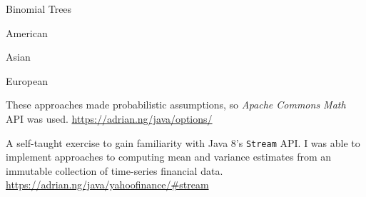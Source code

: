 \documentclass[letterpaper,11pt]{article}
\newcommand{\resumeItem}[3]{
	\item\small{
		\textbf{#1}\hfill\tiny{#2\\}\small{ #3 \vspace{-2pt}}
	}
}
\newcommand{\resumeSubItem}[3]{\resumeItem{#1}{#2}{#3}\vspace{-2pt}}
\begin{document}
\begin{description}
\begin{description}[style=multiline,leftmargin=2.5cm]
\begin{itemize*}
			            \item Binomial Trees
		            \end{itemize*}
		      \item[Payoff]
		            \begin{itemize*}
			            \item American
			            \item Asian
			            \item European
		            \end{itemize*}
	      \end{description}
	      These approaches made probabilistic assumptions, so \textit{Apache Commons Math} API was used.
	      \newline
	      \tiny
	      \href{https://adrian.ng/java/options/}{https://adrian.ng/java/options/}
	      \small
	\item[Summarizing financial data]
	      A self-taught exercise to gain familiarity with Java 8's \texttt{Stream} API. I was able to implement approaches to computing mean and variance estimates from an immutable collection of time-series financial data.
	      \hfill
	      \tiny
	      \href{https://adrian.ng/java/yahoofinance/\#stream}{https://adrian.ng/java/yahoofinance/\#stream}
	      \small


\end{description}



\end{document}

